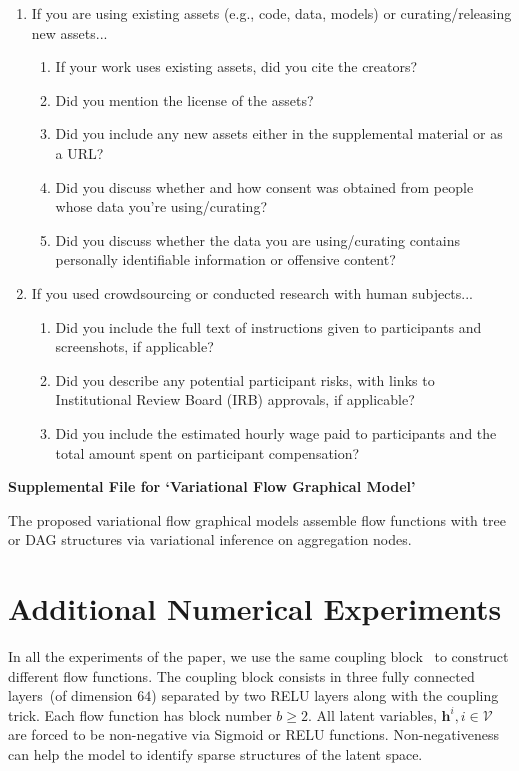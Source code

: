 \documentclass{article}
\begin{document}
\begin{enumerate}
\item If you are using existing assets (e.g., code, data, models) or curating/releasing new assets...
\begin{enumerate}
  \item If your work uses existing assets, did you cite the creators?
    \answerYes{}
  \item Did you mention the license of the assets?
    \answerNo{}
  \item Did you include any new assets either in the supplemental material or as a URL?
    \answerNo{}
  \item Did you discuss whether and how consent was obtained from people whose data you're using/curating?
    \answerYes{}
  \item Did you discuss whether the data you are using/curating contains personally identifiable information or offensive content?
    \answerNA{}
\end{enumerate}

\item If you used crowdsourcing or conducted research with human subjects...
\begin{enumerate}
  \item Did you include the full text of instructions given to participants and screenshots, if applicable?
    \answerNA{}
  \item Did you describe any potential participant risks, with links to Institutional Review Board (IRB) approvals, if applicable?
    \answerNA{}
  \item Did you include the estimated hourly wage paid to participants and the total amount spent on participant compensation?
    \answerNA{}
\end{enumerate}

\end{enumerate}


\appendix
\newpage
\begin{center}
{\LARGE \textbf{Supplemental File for `Variational Flow Graphical Model'}}
\end{center}

The proposed variational flow graphical models assemble flow functions with tree or DAG structures via variational inference on aggregation nodes. 


\section{Additional Numerical Experiments}
In all the experiments of the paper, we use the same  coupling block~\cite{Dinh2016DensityEU} to construct different flow functions. 
The coupling block consists in three fully connected layers~(of dimension $64$) separated by two RELU layers along with the coupling trick. 
Each flow function has block number $b\geqslant 2$. 
All latent variables, $\mathbf{h}^{i}, i \in \mathcal{V}$ are forced to be non-negative via Sigmoid or RELU functions. 
Non-negativeness can help the model to identify sparse structures of the latent space. 
\end{document}
